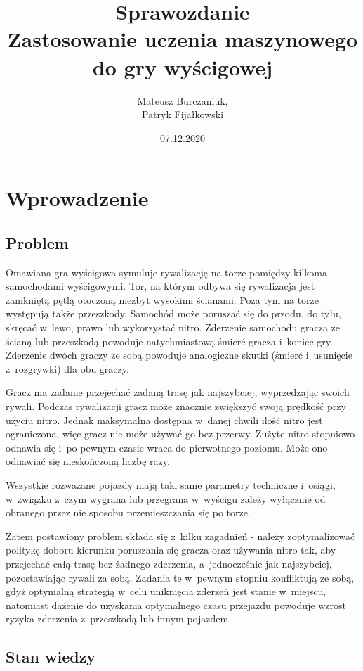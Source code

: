 \documentclass[a4paper,12pt]{article}
\title{Sprawozdanie \\
\Large Zastosowanie uczenia maszynowego do gry wyścigowej}
\author{Mateusz Burczaniuk,\\ Patryk Fijałkowski}
\date{07.12.2020}
\let\oldsection\section
\renewcommand\section{\clearpage\oldsection}
\begin{document}
	\maketitle
	\tableofcontents

\section{Wprowadzenie}
\subsection{Problem}
Omawiana gra wyścigowa symuluje rywalizację na torze pomiędzy kilkoma samochodami wyścigowymi. Tor, na którym odbywa się rywalizacja jest zamkniętą pętlą otoczoną niezbyt wysokimi ścianami. Poza tym na torze występują także przeszkody. Samochód może poruszać się do przodu, do tyłu, skręcać w~lewo, prawo lub wykorzystać nitro. Zderzenie samochodu gracza ze ścianą lub przeszkodą powoduje natychmiastową śmierć gracza i~koniec gry. Zderzenie dwóch graczy ze sobą powoduje analogiczne skutki (śmierć i~usunięcie z~rozgrywki) dla obu graczy.

Gracz ma zadanie przejechać zadaną trasę jak najszybciej, wyprzedzając swoich rywali. Podczas rywalizacji gracz może znacznie zwiększyć swoją prędkość przy użyciu nitro. Jednak maksymalna dostępna w~danej chwili ilość nitro jest ograniczona, więc gracz nie może używać go bez przerwy. Zużyte nitro stopniowo odnawia się i~po pewnym czasie wraca do pierwotnego poziomu. Może ono odnawiać się nieskończoną liczbę razy.

Wszystkie rozważane pojazdy mają taki same parametry techniczne i~osiągi, w~związku z~czym wygrana lub przegrana w~wyścigu zależy wyłącznie od obranego przez nie sposobu przemieszczania się po torze.

Zatem postawiony problem składa się z~kilku zagadnień - należy zoptymalizować politykę doboru kierunku poruszania się gracza oraz używania nitro tak, aby przejechać całą trasę bez żadnego zderzenia, a~jednocześnie jak najszybciej, pozostawiając rywali za sobą. Zadania te w~pewnym stopniu konfliktują ze sobą, gdyż optymalną strategią w~celu uniknięcia zderzeń jest stanie w~miejscu, natomiast dążenie do uzyskania optymalnego czasu przejazdu powoduje wzrost ryzyka zderzenia z~przeszkodą lub innym pojazdem.


\subsection{Stan wiedzy}
\end{document}
